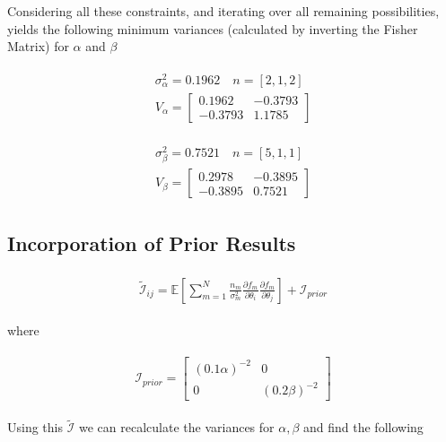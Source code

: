 \documentclass[paper=a4, fontsize=11pt]{scrartcl} %
\numberwithin{equation}{section} %
\numberwithin{figure}{section} %
\numberwithin{table}{section} %
\numberwithin{equation}{subsection}
\begin{document}
Considering all these constraints, and iterating over all remaining possibilities, yields the following minimum variances (calculated by inverting the Fisher Matrix) for $\alpha$ and $\beta$

\begin{align}
\begin{split}
\sigma_\alpha^2 = 0.1962 \quad n = [2, 1, 2] 
\\ V_\alpha = \left[\begin{matrix}
0.1962 & -0.3793
\\-0.3793 & 1.1785
\end{matrix}\right]
\end{split}
\end{align}

\begin{align}
\begin{split}
\sigma_\beta^2 = 0.7521 \quad n = [5, 1, 1] 
\\ V_\beta = \left[\begin{matrix}
0.2978 & -0.3895
\\-0.3895 & 0.7521
\end{matrix}\right]
\end{split}
\end{align}

\subsection{Incorporation of Prior Results}

\begin{align}
\begin{split}
\tilde{\mathcal{I}}_{ij} = \mathbb{E}\left[\sum_{m=1}^N \frac{n_m}{\sigma_m^2} \frac{\partial f_m}{\partial \theta_i}  \frac{\partial f_m}{\partial \theta_j}\right] + \mathcal{I}_{prior}
\end{split}
\end{align}

where 

\begin{align}
\begin{split}
\mathcal{I}_{prior} = \left[ \begin{matrix}
(0.1 \alpha)^{-2} & 0 \\ 0 & (0.2 \beta)^{-2}
\end{matrix}\right]
\end{split}
\end{align}

Using this $\tilde{\mathcal{I}}$ we can recalculate the variances for $\alpha, \beta$ and find the following
\end{document}
